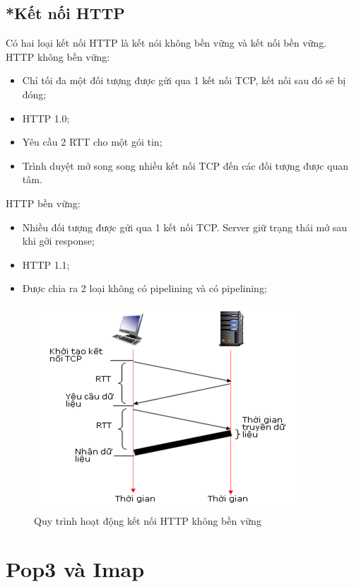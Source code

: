 \documentclass[APA,STIX1COL]{WileyNJD-v2}
\begin{document}
\subsection*{*Kết nối HTTP}
Có hai loại kết nối HTTP là kết nói không bền vững và kết nối bền vững. \\

HTTP không bền vững:
\begin{itemize}
  \item Chỉ tối đa một đối tượng được gửi qua 1 kết nối TCP, kết nối sau đó sẽ bị đóng;
  \item HTTP 1.0;
  \item Yêu cầu 2 RTT cho một gói tin;
  \item Trình duyệt mở song song nhiều kết nối TCP đến các đối tượng được quan tâm.
\end{itemize}

HTTP bền vững:
\begin{itemize}
  \item Nhiều đối tượng được gửi qua 1 kết nối TCP. Server giữ trạng thái mở sau khi gởi response;
  \item HTTP 1.1;
  \item Được chia ra 2 loại không có pipelining và có pipelining;
\end{itemize}

\begin{figure}[h]
  \centering
  \includegraphics[scale=0.7]{http_1}
  \caption{Quy trình hoạt động kết nối HTTP không bền vững}
  \label{fig:http_1}
\end{figure}





\section{Pop3 và Imap}\label{sec3}
\end{document}
